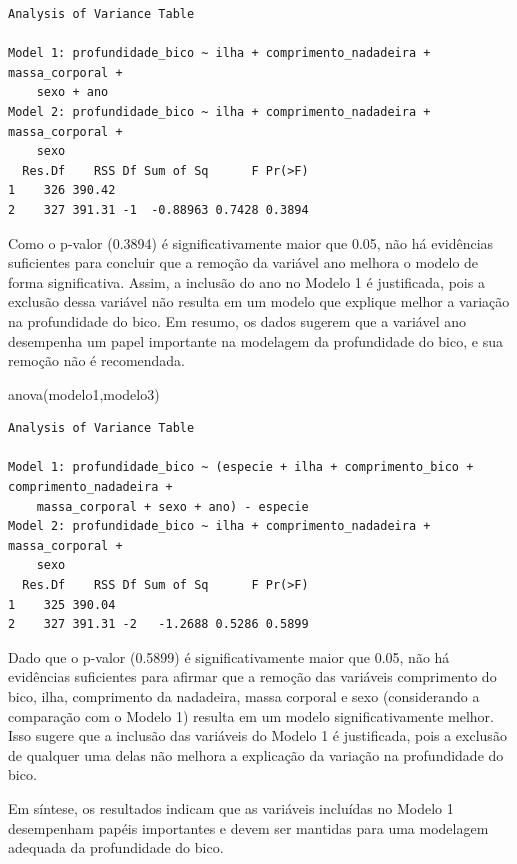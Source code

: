 \documentclass[
  letterpaper,
  DIV=11,
  numbers=noendperiod]{scrartcl}
\newenvironment{Shaded}{\begin{snugshade}}{\end{snugshade}}
\newcommand{\FunctionTok}[1]{\textcolor[rgb]{0.28,0.35,0.67}{#1}}
\newcommand{\NormalTok}[1]{\textcolor[rgb]{0.00,0.23,0.31}{#1}}
\begin{document}
\begin{verbatim}
Analysis of Variance Table

Model 1: profundidade_bico ~ ilha + comprimento_nadadeira + massa_corporal + 
    sexo + ano
Model 2: profundidade_bico ~ ilha + comprimento_nadadeira + massa_corporal + 
    sexo
  Res.Df    RSS Df Sum of Sq      F Pr(>F)
1    326 390.42                           
2    327 391.31 -1  -0.88963 0.7428 0.3894
\end{verbatim}

Como o p-valor (0.3894) é significativamente maior que 0.05, não há
evidências suficientes para concluir que a remoção da variável ano
melhora o modelo de forma significativa. Assim, a inclusão do ano no
Modelo 1 é justificada, pois a exclusão dessa variável não resulta em um
modelo que explique melhor a variação na profundidade do bico. Em
resumo, os dados sugerem que a variável ano desempenha um papel
importante na modelagem da profundidade do bico, e sua remoção não é
recomendada.

\begin{Shaded}
\begin{Highlighting}[]
\FunctionTok{anova}\NormalTok{(modelo1,modelo3)}
\end{Highlighting}
\end{Shaded}

\begin{verbatim}
Analysis of Variance Table

Model 1: profundidade_bico ~ (especie + ilha + comprimento_bico + comprimento_nadadeira + 
    massa_corporal + sexo + ano) - especie
Model 2: profundidade_bico ~ ilha + comprimento_nadadeira + massa_corporal + 
    sexo
  Res.Df    RSS Df Sum of Sq      F Pr(>F)
1    325 390.04                           
2    327 391.31 -2   -1.2688 0.5286 0.5899
\end{verbatim}

Dado que o p-valor (0.5899) é significativamente maior que 0.05, não há
evidências suficientes para afirmar que a remoção das variáveis
comprimento do bico, ilha, comprimento da nadadeira, massa corporal e
sexo (considerando a comparação com o Modelo 1) resulta em um modelo
significativamente melhor. Isso sugere que a inclusão das variáveis do
Modelo 1 é justificada, pois a exclusão de qualquer uma delas não
melhora a explicação da variação na profundidade do bico.

Em síntese, os resultados indicam que as variáveis incluídas no Modelo 1
desempenham papéis importantes e devem ser mantidas para uma modelagem
adequada da profundidade do bico.
\end{document}
